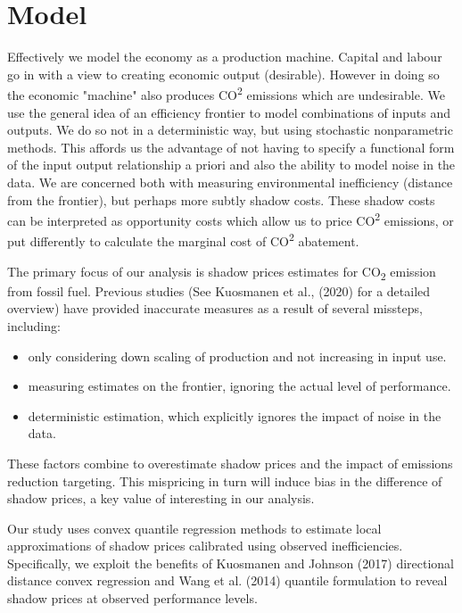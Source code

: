 \documentclass[
  10pt,
]{article}
\providecommand{\tightlist}{%
  \setlength{\itemsep}{0pt}\setlength{\parskip}{0pt}}
\begin{document}
\hypertarget{model}{%
\section{Model}\label{model}}

Effectively we model the economy as a production machine.  Capital and labour go in with a view to creating economic output (desirable).  However in doing so the economic "machine" also produces CO\textsuperscript{2} emissions which are undesirable.  We use the general idea of an efficiency frontier to model combinations of inputs and outputs.  We do so not in a deterministic way, but using stochastic nonparametric methods.  This affords us the advantage of not having to specify a functional form of the input output relationship a priori and also the ability to model noise in the data.  We are concerned both with measuring environmental inefficiency (distance from the frontier), but perhaps more subtly shadow costs.  These shadow costs can be interpreted as opportunity costs which allow us to price CO\textsuperscript{2} emissions, or put differently to calculate the marginal cost of CO\textsuperscript{2} abatement. 

The primary focus of our analysis is shadow prices estimates for
CO\textsubscript{2} emission from fossil fuel. Previous studies (See Kuosmanen et al., (2020) for a detailed overview) have
provided inaccurate measures as a result of several missteps, including:

\begin{itemize}
\tightlist
\item
  only considering down scaling of production and not increasing in input
  use.
\item
  measuring estimates on the frontier, ignoring the actual level of
  performance.
\item
  deterministic estimation, which explicitly ignores the impact of noise
  in the data.
\end{itemize}

These factors combine to overestimate shadow prices and the impact of emissions reduction
targeting.  This mispricing in turn will induce bias in the difference of shadow prices, a key value of interesting in our analysis.


Our study uses convex quantile regression methods to estimate
local approximations of shadow prices calibrated using observed
inefficiencies. Specifically, we exploit the benefits of Kuosmanen and
Johnson (2017) directional distance convex regression and Wang et al.
(2014) quantile formulation to reveal shadow prices at observed
performance levels. 
\end{document}
